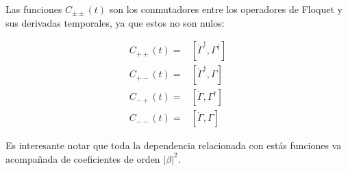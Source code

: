 \documentclass[a4paper,10pt]{report}
\begin{document}
Las funciones $C_{\pm \pm}(t)$ son los conmutadores entre los operadores de Floquet y sus derivadas temporales, ya que estos no son nulos:

\begin{align*}
C_{++}(t) =& [\dot{\Gamma}^{\dagger}, \Gamma^{\dagger}]\\
C_{+-}(t) =& [\dot{\Gamma}^{\dagger}, \Gamma]\\
C_{-+}(t) =& [\dot{\Gamma}, \Gamma^{\dagger}]\\
C_{--}(t) =& [\dot{\Gamma}, \Gamma]
\end{align*} 
 
Es interesante notar que toda la dependencia relacionada con estás funciones va acompañada de coeficientes de orden $|\beta|^2$.
 


\end{document}
